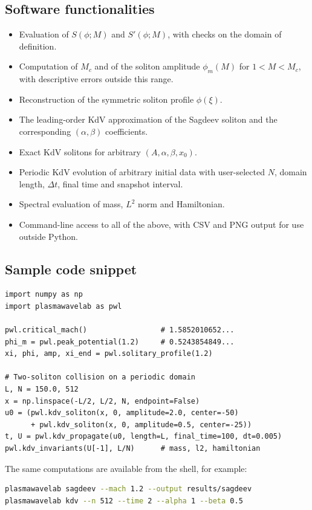 \documentclass[preprint,12pt]{elsarticle}
\begin{document}
\subsection{Software functionalities}
\label{sec:functionalities}

\begin{itemize}
\item Evaluation of $S(\phi;M)$ and $S'(\phi;M)$, with checks on the domain
  of definition.
\item Computation of $M_c$ and of the soliton amplitude $\phi_m(M)$ for
  $1<M<M_c$, with descriptive errors outside this range.
\item Reconstruction of the symmetric soliton profile $\phi(\xi)$.
\item The leading-order KdV approximation of the Sagdeev soliton and the
  corresponding $(\alpha,\beta)$ coefficients.
\item Exact KdV solitons for arbitrary $(A,\alpha,\beta,x_0)$.
\item Periodic KdV evolution of arbitrary initial data with user-selected $N$,
  domain length, $\Delta t$, final time and snapshot interval.
\item Spectral evaluation of mass, $L^2$ norm and Hamiltonian.
\item Command-line access to all of the above, with CSV and PNG output for use
  outside Python.
\end{itemize}

\subsection{Sample code snippet}
\label{sec:snippet}

\begin{lstlisting}
import numpy as np
import plasmawavelab as pwl

pwl.critical_mach()                 # 1.5852010652...
phi_m = pwl.peak_potential(1.2)     # 0.5243854849...
xi, phi, amp, xi_end = pwl.solitary_profile(1.2)

# Two-soliton collision on a periodic domain
L, N = 150.0, 512
x = np.linspace(-L/2, L/2, N, endpoint=False)
u0 = (pwl.kdv_soliton(x, 0, amplitude=2.0, center=-50)
      + pwl.kdv_soliton(x, 0, amplitude=0.5, center=-25))
t, U = pwl.kdv_propagate(u0, length=L, final_time=100, dt=0.005)
pwl.kdv_invariants(U[-1], L/N)      # mass, l2, hamiltonian
\end{lstlisting}

The same computations are available from the shell, for example:
\begin{lstlisting}[language=bash]
plasmawavelab sagdeev --mach 1.2 --output results/sagdeev
plasmawavelab kdv --n 512 --time 2 --alpha 1 --beta 0.5
\end{lstlisting}
\end{document}
